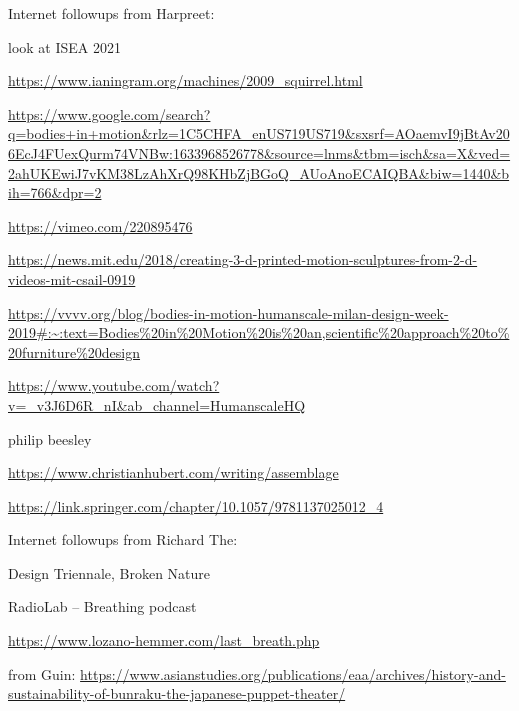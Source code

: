 \documentclass[11pt]{report}
\begin{document}
\vspace{1cm}
Internet followups from Harpreet:

look at ISEA 2021

\url{https://www.ianingram.org/machines/2009_squirrel.html}

\url{https://www.google.com/search?q=bodies+in+motion&rlz=1C5CHFA_enUS719US719&sxsrf=AOaemvI9jBtAv206EcJ4FUexQurm74VNBw:1633968526778&source=lnms&tbm=isch&sa=X&ved=2ahUKEwiJ7vKM38LzAhXrQ98KHbZjBGoQ_AUoAnoECAIQBA&biw=1440&bih=766&dpr=2}

\url{https://vimeo.com/220895476}

\url{https://news.mit.edu/2018/creating-3-d-printed-motion-sculptures-from-2-d-videos-mit-csail-0919}

\url{https://vvvv.org/blog/bodies-in-motion-humanscale-milan-design-week-2019#:~:text=Bodies%20in%20Motion%20is%20an,scientific%20approach%20to%20furniture%20design}

\url{https://www.youtube.com/watch?v=_v3J6D6R_nI&ab_channel=HumanscaleHQ}

philip beesley

\url{https://www.christianhubert.com/writing/assemblage} 
      
\url{https://link.springer.com/chapter/10.1057/9781137025012_4}



\vspace{1cm}
Internet followups from Richard The:

Design Triennale, Broken Nature

RadioLab -- Breathing podcast

\url{https://www.lozano-hemmer.com/last\_breath.php}


\vspace{1cm}
from Guin: \url{https://www.asianstudies.org/publications/eaa/archives/history-and-sustainability-of-bunraku-the-japanese-puppet-theater/}
\end{document}
